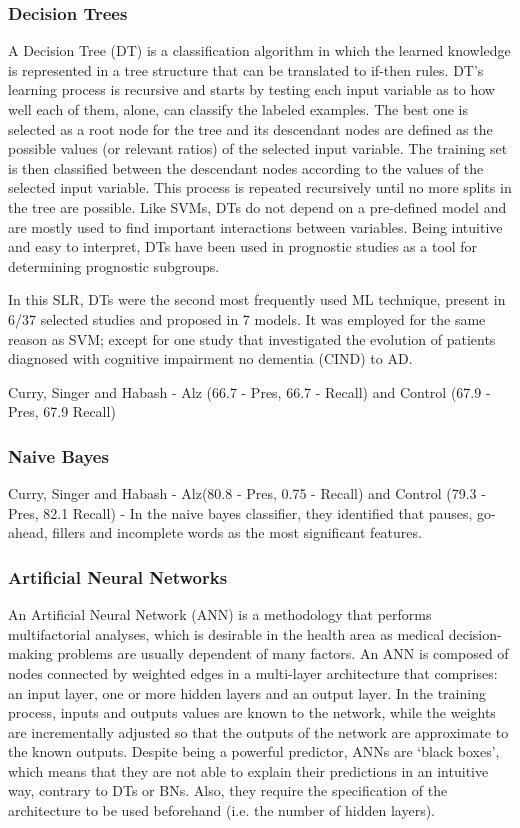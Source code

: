 \subsubsection{Decision Trees}
A Decision Tree (DT) is a classification algorithm in which the learned knowledge is represented in a tree structure that can be translated to if-then rules. DT's learning process is recursive and starts by testing each input variable as to how well each of them, alone, can classify the labeled examples. The best one is selected as a root node for the tree and its descendant nodes are defined as the possible values (or relevant ratios) of the selected input variable. The training set is then classified between the descendant nodes according to the values of the selected input variable. This process is repeated recursively until no more splits in the tree are possible. Like SVMs, DTs do not depend on a pre-defined model and are mostly used to find important interactions between variables. Being intuitive and easy to interpret, DTs have been used in prognostic studies as a tool for determining prognostic subgroups.
\par 
In this SLR, DTs were the second most frequently used ML technique, present in 6/37 selected studies and proposed in 7 models. It was employed for the same reason as SVM; except for one study that investigated the evolution of patients diagnosed with cognitive impairment no dementia (CIND) to AD.


Curry, Singer and Habash - Alz (66.7 - Pres, 66.7 - Recall) and Control (67.9 - Pres, 67.9 Recall)

\subsubsection{Naive Bayes}

Curry, Singer and Habash - Alz(80.8 - Pres, 0.75 - Recall) and Control (79.3 - Pres, 82.1 Recall) - In the naive bayes classifier, they identified that pauses, go-ahead, fillers and incomplete words as the most significant features.  %

\subsubsection{Artificial Neural Networks}
An Artificial Neural Network (ANN) is a methodology that performs multifactorial analyses, which is desirable in the health area as medical decision-making problems are usually dependent of many factors. An ANN is composed of nodes connected by weighted edges in a multi-layer architecture that comprises: an input layer, one or more hidden layers and an output layer. In the training process, inputs and outputs values are known to the network, while the weights are incrementally adjusted so that the outputs of the network are approximate to the known outputs. Despite being a powerful predictor, ANNs are `black boxes', which means that they are not able to explain their predictions in an intuitive way, contrary to DTs or BNs. Also, they require the specification of the architecture to be used beforehand (i.e. the number of hidden layers).

